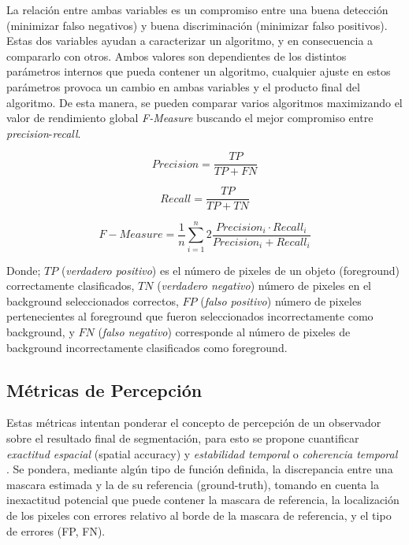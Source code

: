 La relación entre ambas variables es un compromiso entre una buena detección (minimizar falso negativos) y buena discriminación (minimizar falso positivos). Estas dos variables ayudan a caracterizar un algoritmo, y en consecuencia a compararlo con otros. Ambos valores son dependientes de los distintos parámetros internos que pueda contener un algoritmo, cualquier ajuste en estos parámetros provoca un cambio en ambas variables y el producto final del algoritmo. De esta manera, se pueden comparar varios algoritmos maximizando el valor de rendimiento global \emph{F-Measure} buscando el mejor compromiso entre \emph{precision}-\emph{recall}.



\begin{equation}
Precision=\frac{TP}{TP+FN}
\end{equation}

\begin{equation}
Recall=\frac{TP}{TP+TN}
\end{equation}

\begin{equation}
F-Measure=\frac{1}{n}\sum_{i=1}^n{2\frac{Precision_{i} \cdot Recall_{i}}{Precision_{i}+Recall_{i}}}
\end{equation}
 
Donde; $TP$ (\emph{verdadero positivo}) es el número de pixeles de un objeto (foreground) correctamente clasificados, $TN$ (\emph{verdadero negativo}) número de pixeles en el background seleccionados correctos, $FP$ (\emph{falso positivo}) número de pixeles pertenecientes al foreground que fueron seleccionados incorrectamente como background, y $FN$ (\emph{falso negativo}) corresponde al número de pixeles de background incorrectamente clasificados como foreground.



\subsection{Métricas de Percepción}

Estas métricas intentan ponderar el concepto de percepción de un observador sobre el resultado final de segmentación, para esto se propone cuantificar \emph{exactitud espacial} (spatial accuracy) y \emph{estabilidad temporal} \cite{liu_metrics_2011} \cite{cavallaro_objective_2002} o \emph{coherencia temporal} \cite{villegas_perceptually-weighted_2004}. Se pondera, mediante algún tipo de función definida, la discrepancia entre una mascara estimada y la de su referencia (ground-truth), tomando en cuenta la inexactitud potencial que puede contener la mascara de referencia, la localización de los pixeles con errores relativo al borde de la mascara de referencia, y el tipo de errores (FP, FN). 

